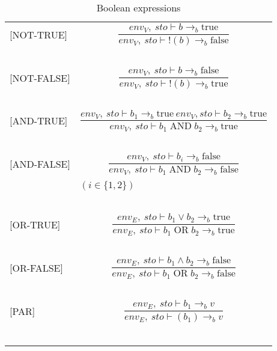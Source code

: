 \begin{longtable}{l l}
[NOT-TRUE] & \[\frac{env_V, \: sto \vdash b \rightarrow_b \text{true}}{env_V, \: sto \vdash !(b)  \rightarrow_b \text{false}}\] \\
~ & ~ \\

[NOT-FALSE] & \[\frac{env_V, \: sto \vdash b \rightarrow_b \text{false}}{env_V, \: sto \vdash !(b)  \rightarrow_b \text{true}}\] \\
~ & ~ \\

[AND-TRUE] & \[\frac{env_V, \: sto \vdash b_1 \rightarrow_b \text{true} \: env_V, sto \vdash b_2 \rightarrow_b \text{true}}{env_V, \: sto \vdash b_1  \; \text{AND} \; b_2 \rightarrow_b \text{true}}\] \\
~ & ~ \\

[AND-FALSE] & \[\frac{env_V, \: sto \vdash b_i \rightarrow_b \text{false}}{env_V, \: sto \vdash b_1  \; \text{AND} \; b_2 \rightarrow_b \text{false}}\] \\
~ & \indent\indent $(i \in \{1,2 \})$ \\
~ & ~ \\

[OR-TRUE] & \[\frac{env_E, \: sto \vdash b_1 \vee b_2 \rightarrow_b \text{true}}{env_E, \: sto \vdash b_1  \; \text{OR} \; b_2 \rightarrow_b \text{true}}\] \\
~ & ~ \\

[OR-FALSE] & \[\frac{env_E, \: sto \vdash b_1 \wedge b_2 \rightarrow_b \text{false}}{env_E, \: sto \vdash b_1  \; \text{OR} \; b_2 \rightarrow_b \text{false}}\] \\
~ & ~ \\

[PAR] & \[\frac{env_E, \: sto \vdash b_1 \rightarrow_b v}{env_E, \: sto \vdash (b_1) \rightarrow_b v}\] \\
~ & ~ \\


\caption{Boolean expressions}
\end{longtable}



